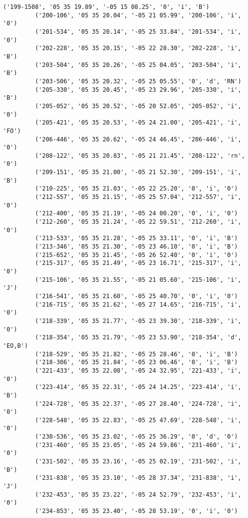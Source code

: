 \documentclass{article}
\begin{document}
\begin{Verbatim}[commandchars=\\\{\}]
         ('199-1508', '05 35 19.89', '-05 15 08.25', '0', 'i', 'B')
         ('200-106', '05 35 20.04', '-05 21 05.99', '200-106', 'i', '0')
         ('201-534', '05 35 20.14', '-05 25 33.84', '201-534', 'i', '0')
         ('202-228', '05 35 20.15', '-05 22 28.30', '202-228', 'i', 'B')
         ('203-504', '05 35 20.26', '-05 25 04.05', '203-504', 'i', 'B')
         ('203-506', '05 35 20.32', '-05 25 05.55', '0', 'd', 'RN')
         ('205-330', '05 35 20.45', '-05 23 29.96', '205-330', 'i', 'B')
         ('205-052', '05 35 20.52', '-05 20 52.05', '205-052', 'i', '0')
         ('205-421', '05 35 20.53', '-05 24 21.00', '205-421', 'i', 'FO')
         ('206-446', '05 35 20.62', '-05 24 46.45', '206-446', 'i', '0')
         ('208-122', '05 35 20.83', '-05 21 21.45', '208-122', 'rn', '0')
         ('209-151', '05 35 21.00', '-05 21 52.30', '209-151', 'i', 'B')
         ('210-225', '05 35 21.03', '-05 22 25.20', '0', 'i', '0')
         ('212-557', '05 35 21.15', '-05 25 57.04', '212-557', 'i', '0')
         ('212-400', '05 35 21.19', '-05 24 00.20', '0', 'i', '0')
         ('212-260', '05 35 21.24', '-05 22 59.51', '212-260', 'i', '0')
         ('213-533', '05 35 21.28', '-05 25 33.11', '0', 'i', 'B')
         ('213-346', '05 35 21.30', '-05 23 46.10', '0', 'i', 'B')
         ('215-652', '05 35 21.45', '-05 26 52.40', '0', 'i', '0')
         ('215-317', '05 35 21.49', '-05 23 16.71', '215-317', 'i', '0')
         ('215-106', '05 35 21.55', '-05 21 05.60', '215-106', 'i', 'J')
         ('216-541', '05 35 21.60', '-05 25 40.70', '0', 'i', '0')
         ('216-715', '05 35 21.62', '-05 27 14.65', '216-715', 'i', '0')
         ('218-339', '05 35 21.77', '-05 23 39.30', '218-339', 'i', '0')
         ('218-354', '05 35 21.79', '-05 23 53.90', '218-354', 'd', 'EO,B')
         ('218-529', '05 35 21.82', '-05 25 28.46', '0', 'i', 'B')
         ('218-306', '05 35 21.84', '-05 23 06.46', '0', 'i', 'B')
         ('221-433', '05 35 22.08', '-05 24 32.95', '221-433', 'i', '0')
         ('223-414', '05 35 22.31', '-05 24 14.25', '223-414', 'i', 'B')
         ('224-728', '05 35 22.37', '-05 27 28.40', '224-728', 'i', '0')
         ('228-548', '05 35 22.83', '-05 25 47.69', '228-548', 'i', '0')
         ('230-536', '05 35 23.02', '-05 25 36.29', '0', 'd', '0')
         ('231-460', '05 35 23.05', '-05 24 59.86', '231-460', 'i', '0')
         ('231-502', '05 35 23.16', '-05 25 02.19', '231-502', 'i', 'B')
         ('231-838', '05 35 23.10', '-05 28 37.34', '231-838', 'i', 'J')
         ('232-453', '05 35 23.22', '-05 24 52.79', '232-453', 'i', '0')
         ('234-853', '05 35 23.40', '-05 28 53.19', '0', 'i', '0')

\end{Verbatim}
\end{document}
